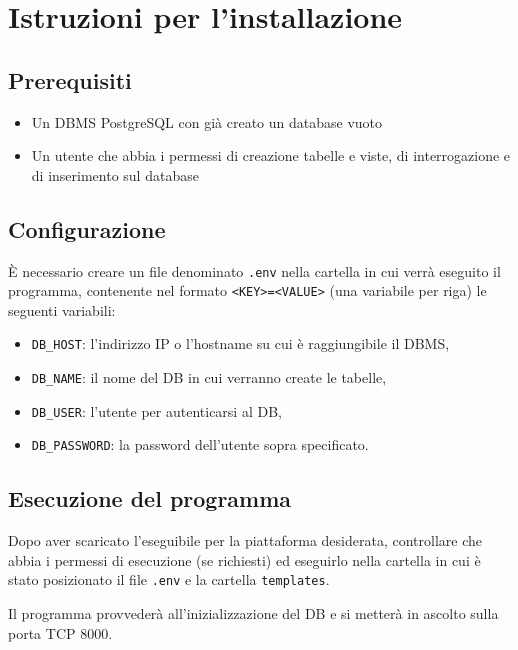 \documentclass[a4paper,12pt]{report}
\begin{document}
	\chapter{Istruzioni per l'installazione}
	\section{Prerequisiti}
	\begin{itemize}
		\item Un DBMS PostgreSQL con già creato un database vuoto
		\item Un utente che abbia i permessi di creazione tabelle e viste, di interrogazione e di inserimento sul database
	\end{itemize}
	\section{Configurazione}
	\par \`E necessario creare un file denominato \texttt{.env} nella cartella in cui verrà eseguito il programma, contenente nel formato \texttt{<KEY>=<VALUE>} (una variabile per riga) le seguenti variabili:
	\begin{itemize}
		\item \texttt{DB\_HOST}: l'indirizzo IP o l'hostname su cui è raggiungibile il DBMS,
		\item \texttt{DB\_NAME}: il nome del DB in cui verranno create le tabelle,
		\item \texttt{DB\_USER}: l'utente per autenticarsi al DB,
		\item \texttt{DB\_PASSWORD}: la password dell'utente sopra specificato.
	\end{itemize}
	\section{Esecuzione del programma}
	\par Dopo aver scaricato l'eseguibile per la piattaforma desiderata, controllare che abbia i permessi di esecuzione (se richiesti) ed eseguirlo nella cartella in cui è stato posizionato il file \texttt{.env} e la cartella \texttt{templates}.
	\par Il programma provvederà all'inizializzazione del DB e si metterà in ascolto sulla porta TCP 8000.
    \listoffigures
\end{document}
